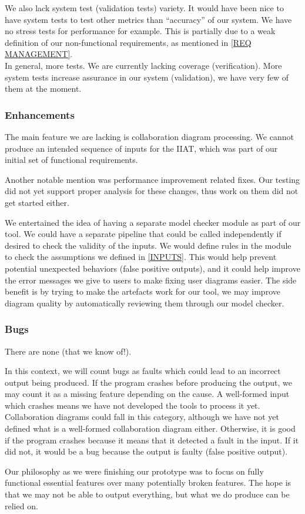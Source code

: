 \documentclass[11pt]{article}
\begin{document}
    We also lack system test (validation tests) variety.
    It would have been nice to have system tests to test other metrics than ``accuracy'' of our system.
    We have no stress tests for performance for example.
    This is partially due to a weak definition of our non-functional requirements, as mentioned in \ref{REQ MANAGEMENT}. \\

    In general, more tests.
    We are currently lacking coverage (verification).
    More system tests increase assurance in our system (validation), we have very few of them at the moment.

    \subsubsection{Enhancements}
    The main feature we are lacking is collaboration diagram processing.
    We cannot produce an intended sequence of inputs for the IIAT, which was part of our initial set of functional requirements.

    Another notable mention was performance improvement related fixes.
    Our testing did not yet support proper analysis for these changes, thus work on them did not get started either.

    We entertained the idea of having a separate model checker module as part of our tool.
    We could have a separate pipeline that could be called independently if desired to check the validity of the inputs.
    We would define rules in the module to check the assumptions we defined in \ref{INPUTS}.
    This would help prevent potential unexpected behaviors (false positive outputs),
    and it could help improve the error messages we give to users to make fixing user diagrams easier.
    The side benefit is by trying to make the artefacts work for our tool,
    we may improve diagram quality by automatically reviewing them through our model checker.


    \subsubsection{Bugs}
    There are none (that we know of!).

    In this context, we will count bugs as faults which could lead to an incorrect output being produced.
    If the program crashes before producing the output, we may count it as a missing feature depending on the cause.
    A well-formed input which crashes means we have not developed the tools to process it yet.
    Collaboration diagrams could fall in this category, although we have not yet defined what is a well-formed collaboration diagram either.
    Otherwise, it is good if the program crashes because it means that it detected a fault in the input.
    If it did not, it would be a bug because the output is faulty (false positive output).

    Our philosophy as we were finishing our prototype was to focus on fully functional essential features over many potentially broken features.
    The hope is that we may not be able to output everything, but what we do produce can be relied on.
\end{document}
